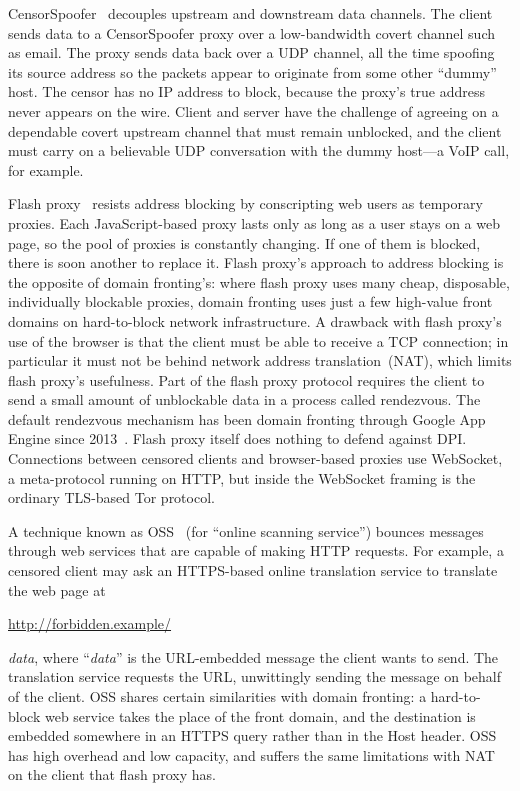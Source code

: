 \documentclass{sig-alternate}
\def\urll#1{\begin{NoHyper}\url{#1}\end{NoHyper}}
\begin{document}
CensorSpoofer~\cite{censorspoofer}
decouples upstream and downstream data channels.
The client sends data to a CensorSpoofer proxy over a low-bandwidth covert channel such as email.
The proxy sends data back over a UDP channel, all the time
spoofing its source address so the packets appear to originate from some other ``dummy'' host.
The censor has no IP address to block, because the proxy's true address never appears on the wire.
Client and server have the challenge of agreeing on a dependable covert upstream channel
that must remain unblocked,
and the client must carry on a believable UDP conversation with the dummy host---a
VoIP call, for example.

Flash proxy~\cite{flashproxy} resists address blocking by
conscripting web users as temporary proxies.
Each JavaScript-based proxy lasts only as long as a
user stays on a web page, so the pool of proxies is constantly changing.
If one of them is blocked, there is soon another to replace it.
Flash proxy's approach to address blocking is
the opposite of domain fronting's:
where flash proxy uses many cheap, disposable, individually blockable proxies,
domain fronting uses just a few high-value front domains on hard-to-block network infrastructure.
A drawback with flash proxy's use of the browser is that
the client must be able to receive a TCP connection; in particular it
must not be behind network address translation~(NAT), which limits flash proxy's usefulness.
Part of the flash proxy protocol requires the client to send
a small amount of unblockable data in a process called rendezvous.
The default rendezvous mechanism has been domain fronting through Google App Engine since 2013~\cite{flashproxy-reg-appspot}.
Flash proxy itself does nothing to defend against DPI.
Connections between censored clients and browser-based proxies use
WebSocket, a meta-protocol running on HTTP,
but inside the WebSocket framing is the ordinary TLS-based Tor protocol.

A technique known as OSS~\cite{oss} (for
``online scanning service'') bounces messages
through web services that are capable of making HTTP requests.
For example, a censored client may ask an HTTPS-based online translation service to
translate the web page at \urll{http://forbidden.example/}\textsl{data},
where ``\textsl{data}'' is the URL-embedded message the client wants to send.
The translation service requests the URL,
unwittingly sending the message on behalf of the client.
OSS shares certain similarities with domain fronting:
a hard-to-block web service takes the place of the front domain,
and the destination is embedded somewhere in an HTTPS query
rather than in the Host header.
OSS has high overhead and low capacity,
and suffers the same limitations with NAT on the client that flash proxy has.
\end{document}
